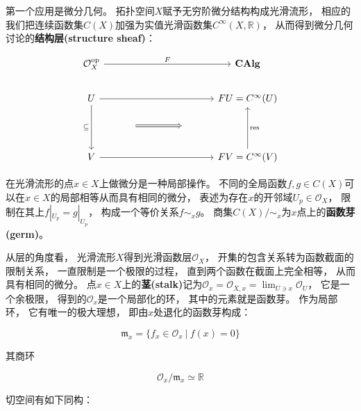 \documentclass[10pt, openany]{book}
\begin{document}
第一个应用是微分几何。
拓扑空间$X$赋予无穷阶微分结构构成光滑流形，
相应的我们把连续函数集$C(X)$加强为实值光滑函数集$C^\infty(X,\mathbb R)$，
从而得到微分几何讨论的\textbf{结构层(structure sheaf)}：

$$
\begin{tikzcd}
\mathcal O_X^\text{op} \arrow[rrrr, "F"] &                           &  &    & \textbf{CAlg}                              \\
U \arrow[dd, "\subseteq"'] \arrow[rrrr]  &                           &  &    & FU = C^\infty(U)                           \\
                                         & {} \arrow[rr, Rightarrow] &  & {} &                                            \\
V \arrow[rrrr]                           &                           &  &    & FV = C^\infty(V) \arrow[uu, "\text{res}"']
\end{tikzcd}
$$

在光滑流形的点$x\in X$上做微分是一种局部操作。
不同的全局函数$f,g \in C(X)$可以在$x \in X$的局部相等从而具有相同的微分，
表述为存在$x$的开邻域$U_p \in \mathcal O_X$，
限制在其上$f|_{U_p} = g|_{U_p}$，
构成一个等价关系$f \sim_x g$。
商集$C(X)/\sim_x$为$x$点上的\textbf{函数芽(germ)}。

从层的角度看，
光滑流形$X$得到光滑函数层$\mathcal O_X$，
开集的包含关系转为函数截面的限制关系，
一直限制是一个极限的过程，
直到两个函数在截面上完全相等，
从而具有相同的微分。
点$x\in X$上的\textbf{茎(stalk)}记为$\mathcal O_x = \mathcal O_{X,x} = \lim_{U \ni x} \mathcal O_U$，
它是一个余极限，
得到的$\mathcal O_x$是一个局部化的环，
其中的元素就是函数芽。
作为局部环，
它有唯一的极大理想，
即由$x$处退化的函数芽构成：

$$
\mathfrak m_x = \{ f_x \in \mathcal O_x \ | \ f(x) = 0 \}
$$

其商环

$$
\mathcal O_x/\mathfrak m_x \simeq \mathbb R
$$

切空间有如下同构：
\end{document}
